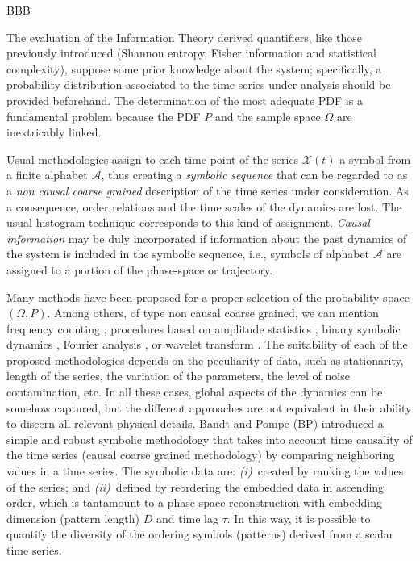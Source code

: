 BBB

The evaluation of the Information Theory derived quantifiers, like those previously introduced (Shannon entropy,
Fisher information and statistical complexity), suppose some prior knowledge about the system; specifically, 
a probability distribution associated to the time series under analysis should be provided beforehand. 
The determination of the most adequate PDF is a fundamental problem because the PDF $P$ and the sample space 
$\Omega$ are inextricably linked. 

Usual methodologies assign to each time point of the series ${\mathcal X}(t)$ a symbol from a  finite alphabet 
$\mathcal{A}$, thus creating a {\it symbolic sequence} that can be regarded to as a {\it non causal coarse 
	grained\/} description of the time series under consideration. 
As a consequence, order relations and the time scales of the dynamics are lost. 
The usual histogram technique corresponds to this kind of assignment.
{\it Causal information\/}  may be duly incorporated if information about the past dynamics of the system is 
included in the symbolic sequence, i.e., symbols of alphabet $\mathcal{A}$ are assigned to a portion of the 
phase-space or trajectory.

Many methods have been proposed for a proper selection of the probability space $(\Omega, P)$. 
Among others, of type non causal coarse grained, we can mention frequency counting \cite{Rosso2009C}, 
procedures based on amplitude statistics \cite{DeMicco2008}, binary symbolic dynamics \cite{Mischaikow1999},
Fourier analysis \cite{Powell1979}, or wavelet transform \cite{Rosso2001}. 
The suitability of each of the proposed methodologies depends on the peculiarity of data, such as stationarity, 
length of the series, the variation of the parameters, the level of noise contamination, etc. 
In all these cases, global aspects of the dynamics can be somehow captured, but the different approaches 
are not equivalent in their ability to discern all relevant physical details.
Bandt and Pompe (BP)\cite{Bandt2002} introduced a simple and robust symbolic methodology that takes into account 
time causality of the time series (causal coarse grained methodology) by comparing neighboring values in a 
time series.
The symbolic data are:
{\it (i)\/}~created by ranking the values of the series; and
{\it (ii)\/}~defined by reordering the embedded data in ascending order, which is tantamount to a phase space 
reconstruction with embedding dimension (pattern length) $D$ and time lag $\tau$.
In this way, it is possible to quantify the diversity of the ordering symbols (patterns) derived from a scalar 
time series.


